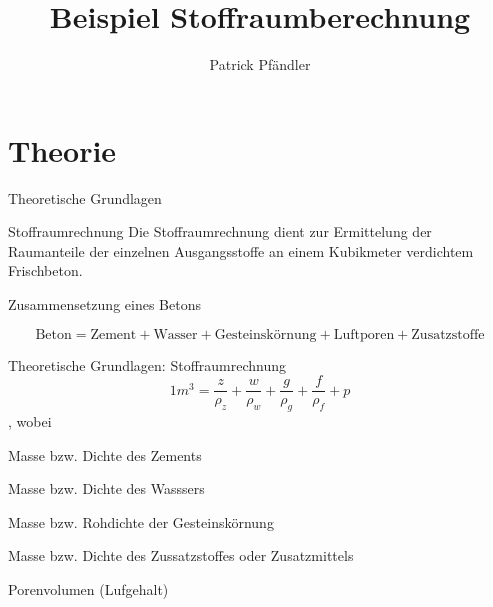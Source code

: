 \def\customoptions{aspectratio=169} %

\title{\textbf{Beispiel Stoffraumberechnung}}
\author{Patrick Pfändler}
\date{{}}



\frame{\titlepage}

\section{Theorie}
\BlueSectionSlide

\begin{frame}{Theoretische Grundlagen}
    \begin{Definition_BS}{Stoffraumrechnung}
        Die Stoffraumrechnung dient zur Ermittelung der Raumanteile der einzelnen Ausgangsstoffe an einem Kubikmeter verdichtem Frischbeton.
    \end{Definition_BS}
    

\end{frame}


\begin{frame}{Zusammensetzung eines  Betons}

    \begin{equation*}
        \text{Beton} = \text{Zement} + \text{Wasser} + \text{Gesteinskörnung} + \text{Luftporen} + \text{Zusatzstoffe}
    \end{equation*}

\end{frame}




\begin{frame}{Theoretische Grundlagen: Stoffraumrechnung}
    \begin{equation*}
        1 m^3 = \frac{z}{\rho_z} + \frac{w}{\rho_w} + \frac{g}{\rho_g} + \frac{f}{\rho_f} + p
    \end{equation*}
    , wobei 
    
    \begin{description}[leftmargin=!,labelwidth=\widthof{Abstand  },font=\normalfont]
        \item[$z, \rho_z$] Masse  bzw. Dichte des Zements 
        \item[$w, \rho_w$] Masse  bzw. Dichte des Wasssers 
        \item[$g, \rho_g$] Masse  bzw. Rohdichte der Gesteinskörnung
        \item[$f, \rho_f$] Masse  bzw. Dichte des Zussatzstoffes oder Zusatzmittels
        \item[$p$] Porenvolumen (Lufgehalt)
    \end{description}

\end{frame}


